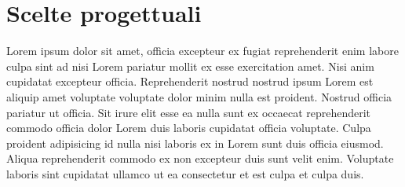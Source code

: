 \documentclass[a4paper]{article}
\begin{document}
\section{Scelte progettuali}
Lorem ipsum dolor sit amet, officia excepteur ex fugiat reprehenderit enim labore culpa sint ad nisi Lorem pariatur mollit ex esse exercitation amet. Nisi anim cupidatat excepteur officia. Reprehenderit nostrud nostrud ipsum Lorem est aliquip amet voluptate voluptate dolor minim nulla est proident. Nostrud officia pariatur ut officia. Sit irure elit esse ea nulla sunt ex occaecat reprehenderit commodo officia dolor Lorem duis laboris cupidatat officia voluptate. Culpa proident adipisicing id nulla nisi laboris ex in Lorem sunt duis officia eiusmod. Aliqua reprehenderit commodo ex non excepteur duis sunt velit enim. Voluptate laboris sint cupidatat ullamco ut ea consectetur et est culpa et culpa duis.
\end{document}
